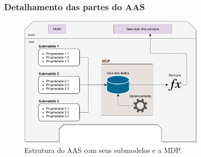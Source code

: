 \documentclass[10pt]{beamer}
\begin{document}
\begin{frame}
	\frametitle{Detalhamento das partes do AAS}
	
	\begin{figure}[htb]
		\centering
		\caption{Estrutura do AAS com seus submodelos e a MDP.}
		\label{fig:estrutura-aas}
		\includegraphics[width=0.8\textwidth]{estrutura-aas}
	\end{figure}
	
\end{frame}
\end{document}
